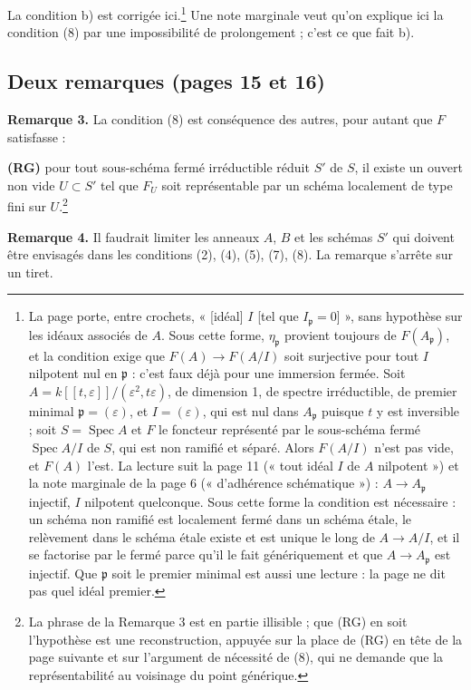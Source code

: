 \documentclass[11pt,a4paper]{article}
\begin{document}
La condition b) est corrigée ici.\footnote{La page porte, entre crochets,
« [idéal] $I$ [tel que $I_{\mathfrak{p}} = 0$] », sans hypothèse sur les
idéaux associés de $A$. Sous cette forme, $\eta_{\mathfrak{p}}$ provient
toujours de $F(A_{\mathfrak{p}})$, et la condition exige que $F(A) \to
F(A/I)$ soit surjective pour tout $I$ nilpotent nul en $\mathfrak{p}$ : c'est
faux déjà pour une immersion fermée. Soit $A = k[[t, \varepsilon]]/
(\varepsilon^2, t\varepsilon)$, de dimension 1, de spectre irréductible, de
premier minimal $\mathfrak{p} = (\varepsilon)$, et $I = (\varepsilon)$, qui
est nul dans $A_{\mathfrak{p}}$ puisque $t$ y est inversible ; soit $S =
\operatorname{Spec} A$ et $F$ le foncteur représenté par le sous-schéma fermé
$\operatorname{Spec} A/I$ de $S$, qui est non ramifié et séparé. Alors
$F(A/I)$ n'est pas vide, et $F(A)$ l'est. La lecture suit la page 11 (« tout
idéal $I$ de $A$ nilpotent ») et la note marginale de la page 6
(« d'adhérence schématique ») : $A \to A_{\mathfrak{p}}$ injectif, $I$
nilpotent quelconque. Sous cette forme la condition est nécessaire : un
schéma non ramifié est localement fermé dans un schéma étale, le relèvement
dans le schéma étale existe et est unique le long de $A \to A/I$, et il se
factorise par le fermé parce qu'il le fait génériquement et que $A \to
A_{\mathfrak{p}}$ est injectif. Que $\mathfrak{p}$ soit le premier minimal
est aussi une lecture : la page ne dit pas quel idéal premier.} Une note
marginale veut qu'on explique ici la condition (8) par une impossibilité de
prolongement ; c'est ce que fait b).

\subsection*{Deux remarques (pages 15 et 16)}

\textbf{Remarque 3.} La condition (8) est conséquence des autres, pour autant
que $F$ satisfasse :

\textbf{(RG)} pour tout sous-schéma fermé irréductible réduit $S'$ de $S$, il
existe un ouvert non vide $U \subset S'$ tel que $F_U$ soit représentable par
un schéma localement de type fini sur $U$.\footnote{La phrase de la Remarque 3
est en partie illisible ; que (RG) en soit l'hypothèse est une reconstruction,
appuyée sur la place de (RG) en tête de la page suivante et sur l'argument de
nécessité de (8), qui ne demande que la représentabilité au voisinage du point
générique.}

\textbf{Remarque 4.} Il faudrait limiter les anneaux $A$, $B$ et les schémas
$S'$ qui doivent être envisagés dans les conditions (2), (4), (5), (7), (8).
La remarque s'arrête sur un tiret.
\end{document}
